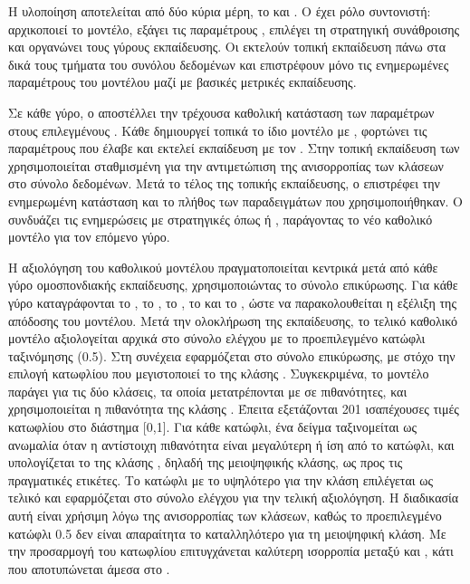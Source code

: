 Η υλοποίηση αποτελείται από δύο κύρια μέρη, το  και . Ο  έχει ρόλο συντονιστή: αρχικοποιεί το μοντέλο, εξάγει τις παραμέτρους , επιλέγει τη στρατηγική συνάθροισης και οργανώνει τους γύρους εκπαίδευσης. Οι  εκτελούν τοπική εκπαίδευση πάνω στα δικά τους τμήματα του συνόλου δεδομένων και επιστρέφουν μόνο τις ενημερωμένες παραμέτρους του μοντέλου μαζί με βασικές μετρικές εκπαίδευσης.

Σε κάθε γύρο, ο  αποστέλλει την τρέχουσα καθολική κατάσταση των  παραμέτρων στους επιλεγμένους . Κάθε  δημιουργεί τοπικά το ίδιο μοντέλο  με , φορτώνει τις παραμέτρους που έλαβε και εκτελεί εκπαίδευση με τον . Στην τοπική εκπαίδευση των  χρησιμοποιείται σταθμισμένη   για την αντιμετώπιση της ανισορροπίας των κλάσεων στο σύνολο δεδομένων. Μετά το τέλος της τοπικής εκπαίδευσης, ο  επιστρέφει την ενημερωμένη κατάσταση  και το πλήθος των παραδειγμάτων που χρησιμοποιήθηκαν. Ο  συνδυάζει τις ενημερώσεις με στρατηγικές όπως  ή , παράγοντας το νέο καθολικό μοντέλο για τον επόμενο γύρο.

Η αξιολόγηση του καθολικού μοντέλου πραγματοποιείται κεντρικά μετά από κάθε γύρο ομοσπονδιακής εκπαίδευσης, χρησιμοποιώντας το σύνολο επικύρωσης. Για κάθε γύρο καταγράφονται το , το , το , το  και το , ώστε να παρακολουθείται η εξέλιξη της απόδοσης του μοντέλου. Μετά την ολοκλήρωση της εκπαίδευσης, το τελικό καθολικό μοντέλο αξιολογείται αρχικά στο σύνολο ελέγχου με το προεπιλεγμένο κατώφλι ταξινόμησης (0.5). Στη συνέχεια εφαρμόζεται  στο σύνολο επικύρωσης, με στόχο την επιλογή κατωφλίου που μεγιστοποιεί το  της κλάσης . Συγκεκριμένα, το μοντέλο παράγει  για τις δύο κλάσεις, τα οποία μετατρέπονται με  σε πιθανότητες, και χρησιμοποιείται η πιθανότητα της κλάσης . Έπειτα εξετάζονται 201 ισαπέχουσες τιμές κατωφλίου στο διάστημα [0,1]. Για κάθε κατώφλι, ένα δείγμα ταξινομείται ως ανωμαλία όταν η αντίστοιχη πιθανότητα είναι μεγαλύτερη ή ίση από το κατώφλι, και υπολογίζεται το  της κλάσης , δηλαδή της μειοψηφικής κλάσης, ως προς τις πραγματικές ετικέτες. Το κατώφλι με το υψηλότερο  για την κλάση  επιλέγεται ως τελικό και εφαρμόζεται στο σύνολο ελέγχου για την τελική αξιολόγηση. Η διαδικασία αυτή είναι χρήσιμη λόγω της ανισορροπίας των κλάσεων, καθώς το προεπιλεγμένο κατώφλι 0.5 δεν είναι απαραίτητα το καταλληλότερο για τη μειοψηφική κλάση. Με την προσαρμογή του κατωφλίου επιτυγχάνεται καλύτερη ισορροπία μεταξύ  και , κάτι που αποτυπώνεται άμεσα στο .

